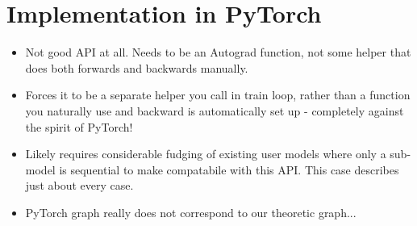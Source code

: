 \section{Implementation in PyTorch}
\begin{itemize}[topsep=0.2em]
    \item Not good API at all. Needs to be an Autograd function, not some helper that does both forwards and backwards manually.
    \item Forces it to be a separate helper you call in train loop, rather than a function you naturally use and backward is automatically set up - completely against the spirit of PyTorch!
    \item Likely requires considerable fudging of existing user models where only a sub-model is sequential to make compatabile with this API. This case describes just about every case.
    \item PyTorch graph really does not correspond to our theoretic graph...
\end{itemize}